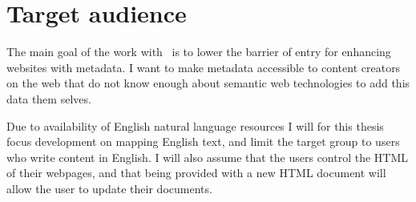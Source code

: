 \section{Target audience}
The main goal of the work with \theartefact\ is to lower the barrier of entry for enhancing websites with metadata.
I want to make metadata accessible to content creators on the web that do not know enough about semantic web technologies
to add this data them selves.

Due to availability of English natural language resources I will for this thesis focus development on mapping English text,
and limit the target group to users who write content in English.
I will also assume that the users control the HTML of their webpages,
and that being provided with a new HTML document will allow the user to update their documents.

